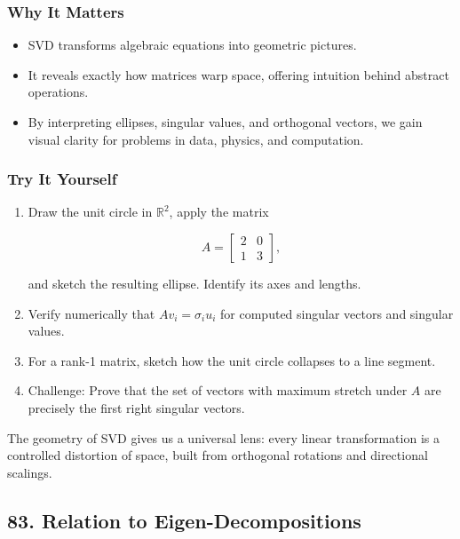\documentclass[
  letterpaper,
  DIV=11,
  numbers=noendperiod]{scrreprt}
\providecommand{\tightlist}{%
  \setlength{\itemsep}{0pt}\setlength{\parskip}{0pt}}
\begin{document}
\subsubsection{Why It Matters}\label{why-it-matters-78}

\begin{itemize}
\tightlist
\item
  SVD transforms algebraic equations into geometric pictures.
\item
  It reveals exactly how matrices warp space, offering intuition behind
  abstract operations.
\item
  By interpreting ellipses, singular values, and orthogonal vectors, we
  gain visual clarity for problems in data, physics, and computation.
\end{itemize}

\subsubsection{Try It Yourself}\label{try-it-yourself-81}

\begin{enumerate}
\def\labelenumi{\arabic{enumi}.}
\item
  Draw the unit circle in \(\mathbb{R}^2\), apply the matrix

  \[
  A = \begin{bmatrix}2 & 0 \\ 1 & 3\end{bmatrix},
  \]

  and sketch the resulting ellipse. Identify its axes and lengths.
\item
  Verify numerically that \(Av_i = \sigma_i u_i\) for computed singular
  vectors and singular values.
\item
  For a rank-1 matrix, sketch how the unit circle collapses to a line
  segment.
\item
  Challenge: Prove that the set of vectors with maximum stretch under
  \(A\) are precisely the first right singular vectors.
\end{enumerate}

The geometry of SVD gives us a universal lens: every linear
transformation is a controlled distortion of space, built from
orthogonal rotations and directional scalings.

\subsection{83. Relation to
Eigen-Decompositions}\label{relation-to-eigen-decompositions}
\end{document}
